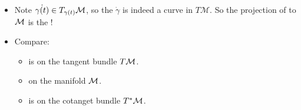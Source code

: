 \documentclass{article}
\begin{document}
\begin{enumerate}
\begin{itemize}
    \item Note $\dot{\gamma(t)}\in T_{\gamma(t)}\mathcal{M}$, so the    $\dot{\gamma}$ is indeed a curve in $T \mathcal{M}$. So the projection of  to $\mathcal{M}$ is the !
    \item Compare:
    \begin{itemize}[$\ast$]
        \item {} is on the tangent bundle $T\mathcal{M}$. 
        \item {} on the manifold $\mathcal{M}$. 
        \item {} is on the cotanget bundle $T^*\mathcal{M}$.
    \end{itemize} 
\end{itemize}
\end{enumerate}
\end{document}
